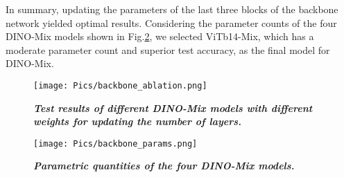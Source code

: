 In summary, updating the parameters of the last three blocks of the backbone network yielded optimal results. Considering the parameter counts of the four DINO-Mix models shown in Fig.\ref{fig:backbone_params}, we selected ViTb14-Mix, which has a moderate parameter count and superior test accuracy, as the final model for DINO-Mix.


    
    
    \begin{figure}[!t]
    \renewcommand{\thefigure}{7} 
        \centering
        \texttt{[image: Pics/backbone\_ablation.png]}
        \vspace{-1em}
        \caption{\emph{\textbf{Test results of different DINO-Mix models with different weights for updating the number of layers.}}}
        \label{fig:backbone_ablation}
    \end{figure}

     \begin{figure}[!t]
    \renewcommand{\thefigure}{8} 
        \centering
        \texttt{[image: Pics/backbone\_params.png]}
        \vspace{-1em}
        \caption{\emph{\textbf{Parametric quantities of the four DINO-Mix models.}}}
        \label{fig:backbone_params}
    \end{figure}



    


